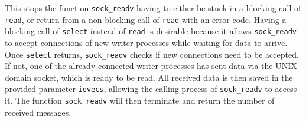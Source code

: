 This stops the function \texttt{sock\_readv} having to either be stuck in a blocking call of \texttt{read}, or return from a non-blocking call of \texttt{read} with an error code.
Having a blocking call of \texttt{select} instead of \texttt{read} is desirable because it allows \texttt{sock\_readv} to accept connections of new writer processes while waiting for data to arrive.
Once \texttt{select} returns, \texttt{sock\_readv} checks if new connections need to be accepted.
If not, one of the already connected writer processes has sent data via the UNIX domain socket, which is ready to be read.
All received data is then saved in the provided parameter \texttt{iovecs}, allowing the calling process of \texttt{sock\_readv} to access it.
The function \texttt{sock\_readv} will then terminate and return the number of received messages.
